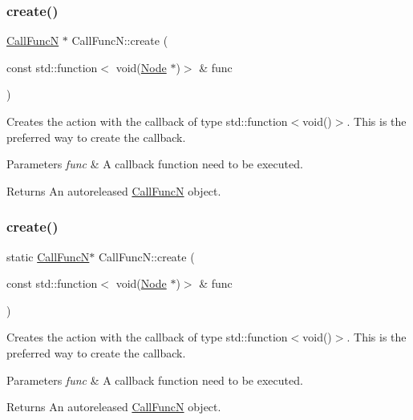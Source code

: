 \subsubsection{\texorpdfstring{create()}{create()}\hspace{0.1cm}{\footnotesize\ttfamily [1/4]}}
{\footnotesize\ttfamily \hyperlink{classCallFuncN}{Call\+FuncN} $\ast$ Call\+Func\+N\+::create (\begin{DoxyParamCaption}\item[{const std\+::function$<$ void(\hyperlink{classNode}{Node} $\ast$)$>$ \&}]{func }\end{DoxyParamCaption})\hspace{0.3cm}{\ttfamily [static]}}

Creates the action with the callback of type std\+::function$<$void()$>$. This is the preferred way to create the callback.


\begin{DoxyParams}{Parameters}
{\em func} & A callback function need to be executed. \\
\hline
\end{DoxyParams}
\begin{DoxyReturn}{Returns}
An autoreleased \hyperlink{classCallFuncN}{Call\+FuncN} object. 
\end{DoxyReturn}
\mbox{\label{classCallFuncN_a7e5d2829154cd6eb68c3e011882bc62d}} 
\subsubsection{\texorpdfstring{create()}{create()}\hspace{0.1cm}{\footnotesize\ttfamily [2/4]}}
{\footnotesize\ttfamily static \hyperlink{classCallFuncN}{Call\+FuncN}$\ast$ Call\+Func\+N\+::create (\begin{DoxyParamCaption}\item[{const std\+::function$<$ void(\hyperlink{classNode}{Node} $\ast$)$>$ \&}]{func }\end{DoxyParamCaption})\hspace{0.3cm}{\ttfamily [static]}}

Creates the action with the callback of type std\+::function$<$void()$>$. This is the preferred way to create the callback.


\begin{DoxyParams}{Parameters}
{\em func} & A callback function need to be executed. \\
\hline
\end{DoxyParams}
\begin{DoxyReturn}{Returns}
An autoreleased \hyperlink{classCallFuncN}{Call\+FuncN} object. 
\end{DoxyReturn}
\mbox{\label{classCallFuncN_a12371cadea736eca54cef676dbe9dab9}} 
